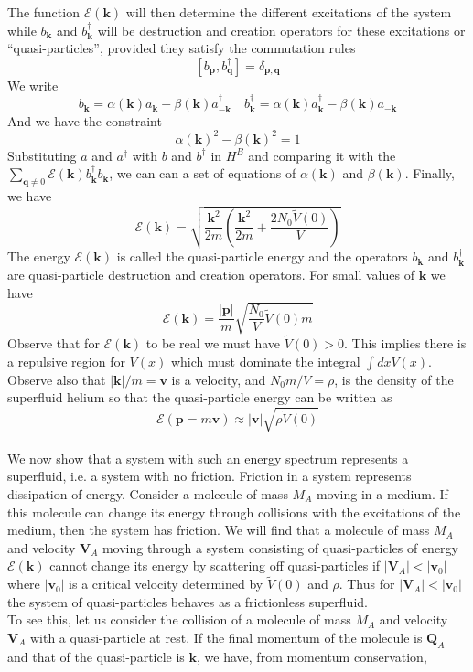 The function $\mathcal{E}(\bm{k})$  will then determine the different excitations of the system while $b_{\bm{k}}$ and $b^{\dagger}_{\bm{k}}$ will be destruction and creation operators for these excitations or ``quasi-particles'', provided they satisfy the commutation rules
\[[b_{\bm{p}},b_{\bm{q}}^{\dagger}] = \delta_{\bm{p},\bm{q}}\]
We write
\[b_{\bm{k}} = \alpha(\bm{k})a_{\bm{k}} - \beta(\bm{k})a^{\dagger}_{-\bm{k}} \quad b^{\dagger}_{\bm{k}} = \alpha(\bm{k})a^{\dagger}_{\bm{k}} - \beta(\bm{k})a_{-\bm{k}} \]
And we have the constraint
\[\alpha(\bm{k})^2 - \beta(\bm{k})^2 = 1\]
Substituting $a$ and $a^{\dagger}$ with $b$ and $b^{\dagger}$ in $H^B$ and comparing it with the $\sum_{\bm{q} \neq 0} \mathcal{E}(\bm{k})b^{\dagger}_{\bm{k}} b_{\bm{k}}$, we can can a set of equations of $\alpha(\bm{k})$ and $\beta(\bm{k})$. Finally, we have
\[\mathcal{E}(\bm{k}) = \sqrt{\frac{\bm{k}^2}{2m} \left(\frac{\bm{k}^2}{2m} + \frac{2N_0\tilde{V}(0)}{V} \right) }\]
The energy $\mathcal{E}(\bm{k})$ is called the quasi-particle energy and the operators $b_{\bm{k}}$ and $b^{\dagger}_{\bm{k}}$ are quasi-particle destruction and creation operators. 
For small values of $\bm{k}$ we have
\[\mathcal{E}(\bm{k}) = \frac{|\bm{p}|}{m} \sqrt{\frac{N_0}{V}\tilde{V}(0)m}\]
Observe that for $\mathcal{E}(\bm{k})$ to be real we must have $\tilde{V}(0) > 0$. This implies there is a repulsive region for $V(x)$ which must dominate the integral $\int dx V(x)$. Observe also that $|\bm{k}|/m = \bm{v}$ is a velocity, and $N_0m/V = \rho$, is the density of the superfluid helium so that the quasi-particle energy can be written as 
\[\mathcal{E}(\bm{p} = m\bm{v}) \approx |\bm{v}|\sqrt{\rho\tilde{V}(0)}\]
\\
We now show that a system with such an energy spectrum represents a superfluid, i.e. a system with no friction.
Friction in a system represents dissipation of energy.
Consider a molecule of mass $M_A$ moving in a medium. If this molecule can change its energy through collisions with the excitations of the medium, then the system has friction. 
We will find that a molecule of mass $M_A$ and velocity $\bm{V}_A$ moving through a system consisting of quasi-particles of energy $\mathcal{E}(\bm{k})$ cannot change its energy by scattering off quasi-particles if $|\bm{V}_A| < |\bm{v}_0|$ where $|\bm{v}_0|$ is a critical velocity determined by $\tilde{V}(0)$ and $\rho$. 
Thus for $|\bm{V}_A| < |\bm{v}_0|$ the system of quasi-particles behaves as a frictionless superfluid.
\\
To see this, let us consider the collision of a molecule of mass $M_A$ and velocity $\bm{V}_A$ with a quasi-particle at rest. If the final momentum of the molecule is $\bm{Q}_A$ and that of the quasi-particle is $\bm{k}$, we have, from momentum conservation,
